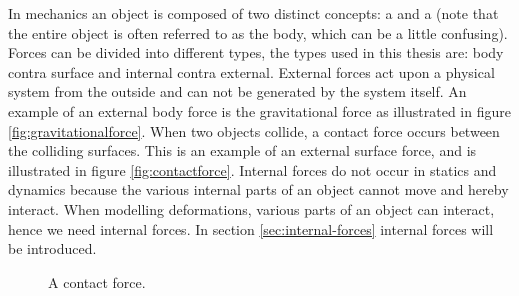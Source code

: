 In mechanics an object is composed of two distinct concepts: a
 and a  (note that the entire object is
often referred to as the body, which can be a little confusing).
%
Forces can be divided into different types, the types used in this
thesis are: body contra surface and internal contra external.
%
External forces act upon a physical system from the outside and can
not be generated by the system itself. 
%
An example of an external body force is the gravitational force as
illustrated in figure \vref{fig:gravitationalforce}. 
When two objects collide, a contact force occurs between
the colliding surfaces. This is an example of an external surface
force, and is illustrated in figure \vref{fig:contactforce}.
%
Internal forces do not occur in statics and dynamics because the
various internal parts of an object cannot move and hereby
interact. When modelling deformations, various parts of an object
can interact, hence we need internal forces.
In section \vref{sec:internal-forces} internal
forces will be introduced.

\layoutnewpage


\begin{figure}
  \centering
  \caption{A contact force.}
  \label{fig:contactforce}
\end{figure}

